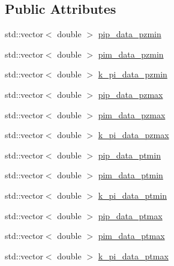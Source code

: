 \subsection*{Public Attributes}
\begin{DoxyCompactItemize}
\item 
std\-::vector$<$ double $>$ \hyperlink{class_neutrino_flux_reweight_1_1_m_i_p_p_numi_yields_bins_aa9625cf6520d1906b084fc7051e28e64}{pip\-\_\-data\-\_\-pzmin}
\item 
std\-::vector$<$ double $>$ \hyperlink{class_neutrino_flux_reweight_1_1_m_i_p_p_numi_yields_bins_a9702c80785cd8eec150cf8a6091192a7}{pim\-\_\-data\-\_\-pzmin}
\item 
std\-::vector$<$ double $>$ \hyperlink{class_neutrino_flux_reweight_1_1_m_i_p_p_numi_yields_bins_a2184256a52d72a1674b7a7a595ad60c9}{k\-\_\-pi\-\_\-data\-\_\-pzmin}
\item 
std\-::vector$<$ double $>$ \hyperlink{class_neutrino_flux_reweight_1_1_m_i_p_p_numi_yields_bins_a245698dccfcff92bc4d1bf3458e2d809}{pip\-\_\-data\-\_\-pzmax}
\item 
std\-::vector$<$ double $>$ \hyperlink{class_neutrino_flux_reweight_1_1_m_i_p_p_numi_yields_bins_aad61319f28e08168c4eabf6507987e29}{pim\-\_\-data\-\_\-pzmax}
\item 
std\-::vector$<$ double $>$ \hyperlink{class_neutrino_flux_reweight_1_1_m_i_p_p_numi_yields_bins_a1832b84f72664c0088c5f8cff20bb041}{k\-\_\-pi\-\_\-data\-\_\-pzmax}
\item 
std\-::vector$<$ double $>$ \hyperlink{class_neutrino_flux_reweight_1_1_m_i_p_p_numi_yields_bins_aec5bdb4bcc7c894e34db336163e0bc13}{pip\-\_\-data\-\_\-ptmin}
\item 
std\-::vector$<$ double $>$ \hyperlink{class_neutrino_flux_reweight_1_1_m_i_p_p_numi_yields_bins_a65177fce103ec850b5804f0ac3d0f5c4}{pim\-\_\-data\-\_\-ptmin}
\item 
std\-::vector$<$ double $>$ \hyperlink{class_neutrino_flux_reweight_1_1_m_i_p_p_numi_yields_bins_a91fe79424c764ccccd3cc31ca91b8cd1}{k\-\_\-pi\-\_\-data\-\_\-ptmin}
\item 
std\-::vector$<$ double $>$ \hyperlink{class_neutrino_flux_reweight_1_1_m_i_p_p_numi_yields_bins_a00b588132209a2d82ffef318273d451a}{pip\-\_\-data\-\_\-ptmax}
\item 
std\-::vector$<$ double $>$ \hyperlink{class_neutrino_flux_reweight_1_1_m_i_p_p_numi_yields_bins_a60a1e09716ccaec014d9ec25689b98be}{pim\-\_\-data\-\_\-ptmax}
\item 
std\-::vector$<$ double $>$ \hyperlink{class_neutrino_flux_reweight_1_1_m_i_p_p_numi_yields_bins_a589ef2889679d14791b9542303fc1322}{k\-\_\-pi\-\_\-data\-\_\-ptmax}
\end{DoxyCompactItemize}
